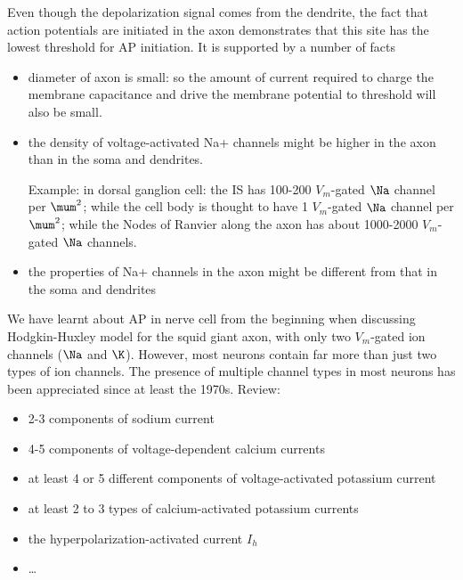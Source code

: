 \begin{mdframed}

Even though the depolarization signal comes from the dendrite,
the fact that action potentials are initiated in the axon demonstrates that this
site has the lowest threshold for AP initiation. It is supported by a number of
facts
\begin{itemize}
  \item diameter of axon is small: so the amount of current required to charge
the membrane capacitance and drive the membrane
potential to threshold will also be small.

  \item the density of voltage-activated Na+ channels might be
higher in the axon than in the soma and dendrites.

Example: in dorsal ganglion cell: the IS has 100-200 $V_m$-gated $\Na$ channel
per $\mum^2$; while the cell body is thought to have 1 $V_m$-gated $\Na$
channel per $\mum^2$; while the Nodes of Ranvier along the axon has about
1000-2000 $V_m$-gated $\Na$ channels.
  
  \item  the properties of Na+ channels in the axon might
be different from that in the soma and dendrites 
\end{itemize}


\end{mdframed}

We have learnt about AP in nerve cell from the beginning when discussing
Hodgkin-Huxley model for the squid giant axon, with only two $V_m$-gated ion
channels ($\Na$ and $\K$). However, most neurons contain far more than just two
types of ion channels.  The presence of multiple channel types in most
neurons has been appreciated since at least the 1970s. Review: \citep{bean2007}
\begin{itemize}
  \item 2-3 components of sodium current
  
  \item 4-5 components of voltage-dependent calcium currents
  
  \item at least  4 or 5 different components of voltage-activated
potassium current

  \item  at least 2 to 3 types of calcium-activated
potassium currents

  \item  the hyperpolarization-activated
current $I_h$ 

  \item  \ldots
\end{itemize}


